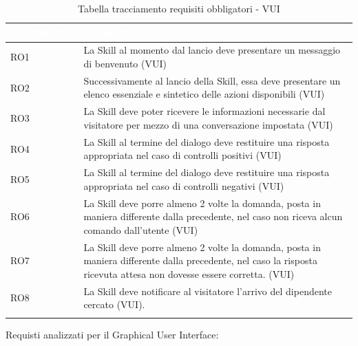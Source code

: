 \begin{center}
	\centering
	\renewcommand{\arraystretch}{1.5}
	\begin{longtable}{  p{2.5cm} p{9.8cm} }
		\rowcolor{tableHead}
		\textbf{\textcolor{white}{Identificativo}} & \textbf{\textcolor{white}{Requisito}} \\
		\endhead  
		RO1 & La Skill al momento dal lancio deve presentare un messaggio di benvenuto (VUI) \\
		RO2 & Successivamente al lancio della Skill, essa deve presentare un elenco essenziale e sintetico delle azioni disponibili (VUI) \\ 
		RO3 & La Skill deve poter ricevere le informazioni necessarie dal visitatore per mezzo di una conversazione impostata (VUI) \\
		RO4 & La Skill al termine del dialogo deve restituire una risposta appropriata nel caso di controlli positivi (VUI) \\
		RO5 & La Skill al termine del dialogo deve restituire una risposta appropriata nel caso di controlli negativi (VUI) \\
		RO6 & La Skill deve porre almeno 2 volte la domanda, posta in maniera differente dalla precedente, nel caso non riceva alcun comando dall'utente (VUI) \\
		RO7 & La Skill deve porre almeno 2 volte la domanda, posta in maniera differente dalla precedente, nel caso la risposta ricevuta attesa non dovesse essere corretta. (VUI)  \\
		RO8 & La Skill deve notificare al visitatore l'arrivo del dipendente cercato (VUI).\\
		\rowcolor{white}
		\caption{Tabella tracciamento requisiti obbligatori - VUI}
	\end{longtable}
\end{center}
Requisti analizzati per il Graphical User Interface:
